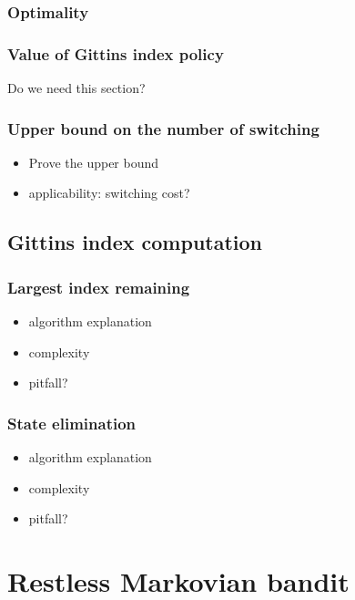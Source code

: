 \subsubsection{Optimality}

\subsubsection{Value of Gittins index policy}

Do we need this section?

\subsubsection{Upper bound on the number of switching}

\begin{itemize}
    \item Prove the upper bound
    \item applicability: switching cost?
\end{itemize}

\subsection{Gittins index computation}

\subsubsection{Largest index remaining}

\begin{itemize}
    \item algorithm explanation
    \item complexity
    \item pitfall?
\end{itemize}

\subsubsection{State elimination}

\begin{itemize}
    \item algorithm explanation
    \item complexity
    \item pitfall?
\end{itemize}

\section{Restless Markovian bandit}
\label{sec:restless_mab_pb}

